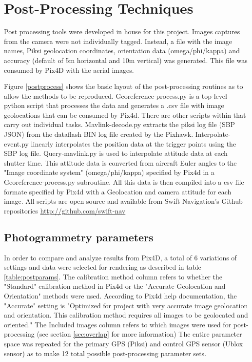 \documentclass{article}
\begin{document}
\section{Post-Processing Techniques}
\label{sec:postprocessing}
Post processing tools were developed in house for this project. Images captures from the camera
were not individually tagged. Instead, a file with the image names, Piksi geolocation coordinates,
orientation data (omega/phi/kappa) and accuracy (default of 5m horizontal and 10m
vertical) was generated. This file was consumed by Pix4D with the aerial images.

Figure \ref{postprocess} shows the basic layout of the post-processing routines as to allow the
methods to be reproduced.  Georeference-process.py is a top-level python script that processes the
data and generates a .csv file with image geolocations that can be consumed by Pix4d. There are
other scripts within that carry out individual tasks. Mavlink-decode.py extracts the piksi log file
(SBP JSON) from the dataflash BIN log file created by the Pixhawk. Interpolate-event.py linearly
interpolates the position data at the trigger points using the SBP log file. Query-mavlink.py is
used to interpolate attitude data at each shutter time. This attitude data is converted from aircraft Euler
angles to the "Image coordinate system" (omega/phi/kappa) specified by Pix4d in a Georeference-process.py
subroutine. All this data is then compiled into a csv file formate specified by Pix4d
with a Geolocation and camera attitude for each image.  All scripts are open-source and
available from Swift Navigation's Github repositories \url{http://github.com/swift-nav}
\subsection{Photogrammetry parameters}
In order to compare and analyze results from Pix4D, a total of 6 variations of settings and data
were selected for rendering as described in table \ref{table:postparams}.  The calibration method
column refers to whether the "Standard" calibration method in Pix4d or the "Accurate Geolocation
and Orientation" methods were used.  According to Pix4d help documentation, the "Accurate" setting
is "Optimized for project with very accurate image geolocation and orientation. This calibration
method requires all images to be geolocated and oriented."\cite{pix4d_support1}  The Included
images column refers to which images were used for post-processing (see section \ref{sec:overlap}
for more information)
The entire parameter space was repeated for the primary GPS (Piksi) and control GPS sensor (Ublox
sensor) as to make 12 total possible post-processing parameter sets.
\end{document}
